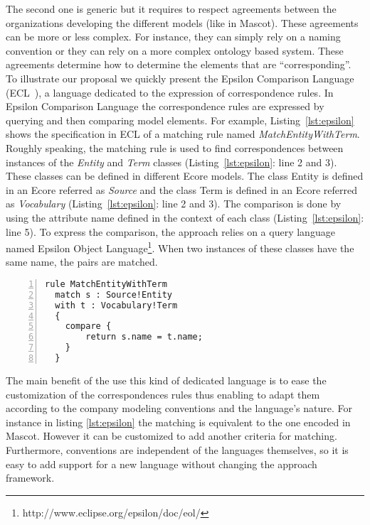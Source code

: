 The second one is generic but it requires to respect agreements between the organizations developing the different models (like in Mascot). These agreements can be more or less complex. For instance, they can simply rely on a naming convention or they can rely on a more complex ontology based system. These agreements determine how to determine the elements that are ``corresponding''. To illustrate our proposal we quickly present the Epsilon Comparison Language (ECL~\cite{TODO_ECLComparisonLanguage}), a language dedicated to the expression of correspondence rules. In Epsilon Comparison Language the correspondence rules are expressed by querying and then comparing model elements. For example, Listing~\ref{lst:epsilon} shows the specification in ECL of a matching rule named \emph{MatchEntityWithTerm}. Roughly speaking, the matching rule is used to find correspondences between instances of the \emph{Entity} and \emph{Term} classes (Listing~\ref{lst:epsilon}: line 2 and 3). These classes can be defined in different Ecore models. The class Entity is defined in an Ecore referred as \emph{Source} and the class Term is defined in an Ecore referred as \emph{Vocabulary} (Listing~\ref{lst:epsilon}: line 2 and 3). The comparison is done by using the attribute name defined in the context of each class (Listing~\ref{lst:epsilon}: line 5). To express the comparison, the approach relies on a query language named Epsilon Object Language\footnote{http://www.eclipse.org/epsilon/doc/eol/}. When two instances of these classes have the same name, the pairs are matched.

\begin{lstlisting}[language=epsilon, caption={The Mascot correspondence rule in the Epsilon Comparison Language}, label={lst:epsilon}, 	basicstyle=\scriptsize\ttfamily, backgroundcolor=\color{LGrey}, numbers=left, xleftmargin=2pt]
rule MatchEntityWithTerm
  match s : Source!Entity
  with t : Vocabulary!Term 
  {
    compare {
	    return s.name = t.name;
    }
  }
\end{lstlisting}

The main benefit of the use this kind of dedicated language is to ease the customization of the correspondences rules thus enabling to adapt them according to the company modeling conventions and the language's nature. For instance in listing \ref{lst:epsilon} the matching is equivalent to the one encoded in Mascot. However it can be customized to add another criteria for matching.
 Furthermore, conventions are independent of the languages themselves, so it is easy to add support for a new language without changing the approach framework.


